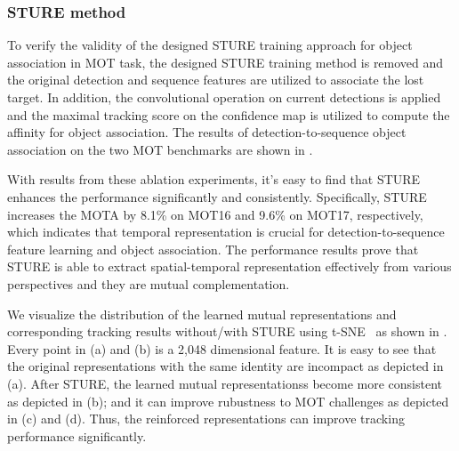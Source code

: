\documentclass[times,twocolumn,final,authoryear]{elsarticle}
\begin{document}
\subsubsection{STURE method}
To verify the validity of the designed STURE training approach for object association in MOT task, the designed STURE training method is removed and the original detection and sequence features are utilized to associate the lost target.
In addition, the convolutional operation on current detections is applied and the maximal tracking score on the confidence map is utilized to compute the affinity for object association.
The results of detection-to-sequence object association on the two MOT benchmarks are shown in .

With results from these ablation experiments, it's easy to find that STURE enhances the performance significantly and consistently. 
Specifically, STURE increases the MOTA by 8.1\% on MOT16 and 9.6\% on MOT17{,} respectively, which indicates that temporal representation is crucial for detection-to-sequence feature learning and object association.
The performance results prove that STURE is able to extract spatial-temporal representation effectively from various perspectives and they are mutual complementation.

{
We visualize the distribution of the learned mutual representations and corresponding tracking results without/with STURE using t-SNE~\citep{van2008visualizing} as shown in .
{
Every point in  (a) and  (b) is a 2,048 dimensional feature.}
It is easy to see that the original representations with the same identity are incompact as depicted in  (a). 
After STURE, the learned mutual representationss become more consistent as depicted in  (b);
and it can improve rubustness to MOT challenges as depicted in  (c) and (d). 
Thus, the reinforced representations can improve tracking performance significantly.
}
%
%
\end{document}
